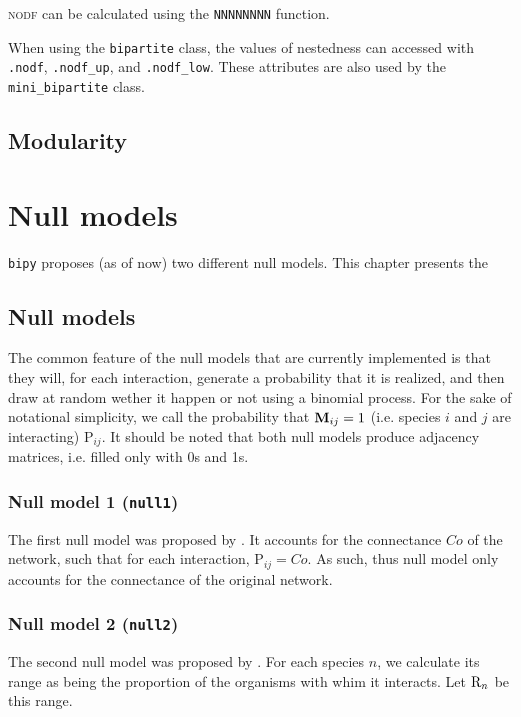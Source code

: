 \documentclass[10pt]{scrbook}
\begin{document}
\textsc{nodf} can be calculated using the \texttt{NNNNNNNN} function.

When using the \texttt{bipartite} class, the values of nestedness can accessed with \texttt{.nodf}, \texttt{.nodf\_up}, and \texttt{.nodf\_low}. These attributes are also used by the \texttt{mini\_bipartite} class.

\section{Modularity}

\chapter{Null models}

\texttt{bipy} proposes (as of now) two different null models. This chapter presents the

\section{Null models}

The common feature of the null models that are currently implemented is that they will, for each interaction, generate a probability that it is realized, and then draw at random wether it happen or not using a binomial process. For the sake of notational simplicity, we call the probability that $\mathbf{M}\sb{ij}=1$ (i.e. species $i$ and $j$ are interacting) $\mathrm{P}_{ij}$. It should be noted that both null models produce adjacency matrices, i.e. filled only with 0s and 1s.

\subsection{Null model 1 (\texttt{null1})}

The first null model was proposed by \citet{Fortuna2006}. It accounts for the connectance $Co$ of the network, such that for each interaction, $\mathrm{P}_{ij} = Co$. As such, thus null model only accounts for the connectance of the original network.

\subsection{Null model 2 (\texttt{null2})}

The second null model was proposed by \citet{Bascompte2003}. For each species $n$, we calculate its range as being the proportion of the organisms with whim it interacts. Let $\mathrm{R}\sb{n}$ be this range.
\end{document}
